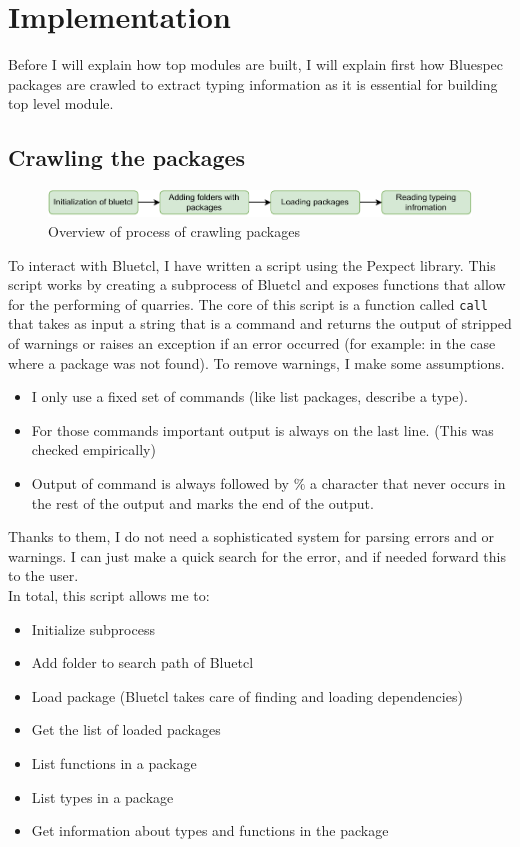 \documentclass[12pt]{report}
\begin{document}
\chapter{Implementation}
Before I will explain how top modules are built, I will explain first how Bluespec packages are crawled to extract typing information as it is essential for building top level module. 
\section{Crawling the packages}
\begin{figure}[!h]
    \centering
    \caption{Overview of process of crawling packages}

    \includegraphics[width=1.0\columnwidth]{pdfExports/LargeMap-Crawling.drawio.pdf}
\end{figure}
To interact with Bluetcl, I have written a script using the Pexpect library. This script works by creating a subprocess of Bluetcl and exposes functions that allow for the performing of quarries. The core of this script is a function called \verb!call! that takes as input a string that is a command and returns the output of stripped of warnings or raises an exception if an error occurred (for example: in the case where a package was not found). To remove warnings, I make some assumptions. 
\begin{itemize}
    \item I only use a fixed set of commands (like list packages, describe a type).  
    \item For those commands important output is always on the last line. (This was checked empirically)   
    \item Output of command is always followed by $\%$ a character that never occurs in the rest of the output and marks the end of the output.  
\end{itemize}   
Thanks to them, I do not need a sophisticated system for parsing errors and or warnings. I can just make a quick search for the error, and if needed forward this to the user.  
  \\   
In total, this script allows me to:   
\begin{itemize}   
\item Initialize subprocess   
\item Add folder to search path of Bluetcl   
\item Load package (Bluetcl takes care of finding and loading dependencies)   
\item Get the list of loaded packages   
\item List functions in a package   
\item List types in a package   
\item Get information about types and functions in the package   
\end{itemize} 
\end{document}
